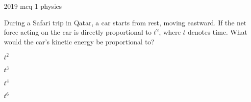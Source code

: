 \ylDisplay
{}%
{2019}%
{mcq}%
{1}%
{physics}%
{}%
{
\ifStatement
During a Safari trip in Qatar, a car starts from rest, moving  eastward. If the net force acting on the car is directly proportional to $t^2$, where $t$ denotes time. What would the car’s kinetic energy be proportional to?
\fi


$t^2$
\fi


$t^3$
\fi


$t^4$
\fi


$t^6$
\fi


\ifHint

\fi


\ifSolution

\fi


\ifEstStatement

\fi



\fi



\fi



\fi



\fi


\ifEstHint

\fi


\ifEstSolution

\fi
}
